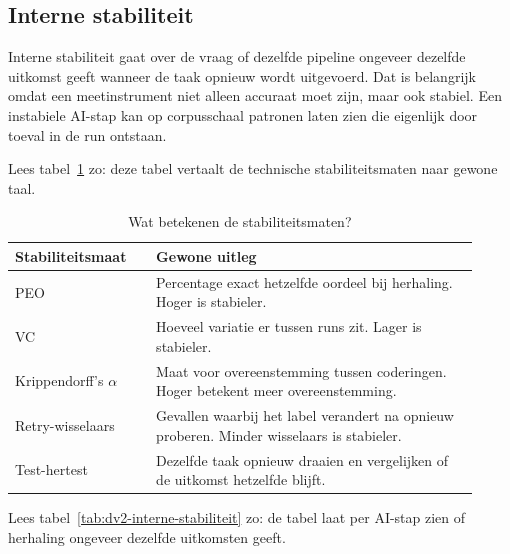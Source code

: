 \subsection{Interne stabiliteit}
\label{subsec:dv2-interne-stabiliteit}

Interne stabiliteit gaat over de vraag of dezelfde pipeline ongeveer dezelfde uitkomst geeft wanneer de taak opnieuw wordt uitgevoerd. Dat is belangrijk omdat een meetinstrument niet alleen accuraat moet zijn, maar ook stabiel. Een instabiele AI-stap kan op corpusschaal patronen laten zien die eigenlijk door toeval in de run ontstaan.

Lees tabel~\ref{tab:dv2-stabiliteitsbegrippen} zo: deze tabel vertaalt de technische stabiliteitsmaten naar gewone taal.

\begin{table}[htbp]
\centering
\small
\caption{Wat betekenen de stabiliteitsmaten?}
\label{tab:dv2-stabiliteitsbegrippen}
\begin{tabular}{p{0.28\linewidth}p{0.64\linewidth}}
\hline
Stabiliteitsmaat & Gewone uitleg \\
\hline
PEO & Percentage exact hetzelfde oordeel bij herhaling. Hoger is stabieler. \\
VC & Hoeveel variatie er tussen runs zit. Lager is stabieler. \\
Krippendorff's $\alpha$ & Maat voor overeenstemming tussen coderingen. Hoger betekent meer overeenstemming. \\
Retry-wisselaars & Gevallen waarbij het label verandert na opnieuw proberen. Minder wisselaars is stabieler. \\
Test-hertest & Dezelfde taak opnieuw draaien en vergelijken of de uitkomst hetzelfde blijft. \\
\hline
\end{tabular}
\end{table}

Lees tabel~\ref{tab:dv2-interne-stabiliteit} zo: de tabel laat per AI-stap zien of herhaling ongeveer dezelfde uitkomsten geeft.

